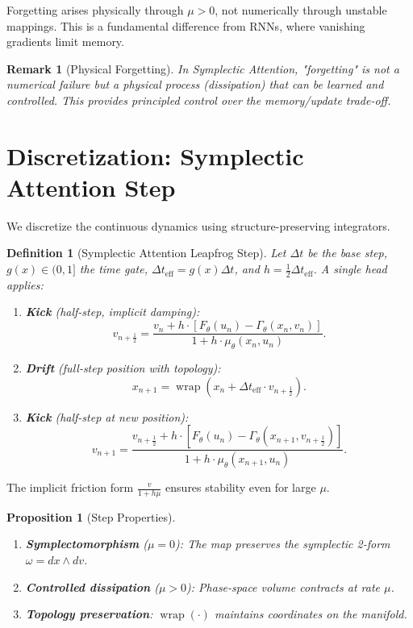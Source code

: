 \documentclass[12pt,letterpaper,twoside]{article}
\newtheorem{definition}{Definition}[section]
\newtheorem{remarque}{Remark}[section]
\newtheorem{prop}{Proposition}[section]
\begin{document}
Forgetting arises physically through $\mu > 0$, not numerically through unstable mappings. This is a fundamental difference from RNNs, where vanishing gradients limit memory.

\begin{remarque}[Physical Forgetting]
In Symplectic Attention, "forgetting" is not a numerical failure but a physical process (dissipation) that can be learned and controlled. This provides principled control over the memory/update trade-off.
\end{remarque}

\section{Discretization: Symplectic Attention Step}

We discretize the continuous dynamics using structure-preserving integrators.

\begin{definition}[Symplectic Attention Leapfrog Step]
Let $\Delta t$ be the base step, $g(x) \in (0, 1]$ the time gate, $\Delta t_{\text{eff}} = g(x) \Delta t$, and $h = \frac{1}{2} \Delta t_{\text{eff}}$. A single head applies:

\begin{enumerate}
\item \textbf{Kick} (half-step, implicit damping):
\[
v_{n+\frac{1}{2}} = \frac{v_n + h \cdot [F_\theta(u_n) - \Gamma_\theta(x_n, v_n)]}{1 + h \cdot \mu_\theta(x_n, u_n)}.
\]

\item \textbf{Drift} (full-step position with topology):
\[
x_{n+1} = \operatorname{wrap}\!\left(x_n + \Delta t_{\text{eff}} \cdot v_{n+\frac{1}{2}}\right).
\]

\item \textbf{Kick} (half-step at new position):
\[
v_{n+1} = \frac{v_{n+\frac{1}{2}} + h \cdot [F_\theta(u_n) - \Gamma_\theta(x_{n+1}, v_{n+\frac{1}{2}})]}{1 + h \cdot \mu_\theta(x_{n+1}, u_n)}.
\]
\end{enumerate}
\end{definition}

The implicit friction form $\frac{v}{1 + h\mu}$ ensures stability even for large $\mu$.

\begin{prop}[Step Properties]
\begin{enumerate}
\item \textbf{Symplectomorphism} ($\mu = 0$): The map preserves the symplectic 2-form $\omega = dx \wedge dv$.
\item \textbf{Controlled dissipation} ($\mu > 0$): Phase-space volume contracts at rate $\mu$.
\item \textbf{Topology preservation}: $\operatorname{wrap}(\cdot)$ maintains coordinates on the manifold.
\end{enumerate}
\end{prop}
\end{document}
